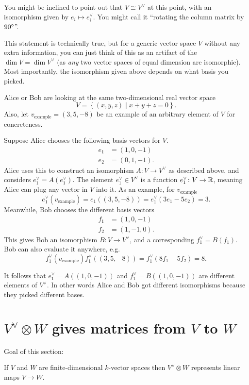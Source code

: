 You might be inclined to point out that $V \cong V^\vee$ at this point,
with an isomorphism given by $e_i \mapsto e_i^\vee$.
You might call it ``rotating the column matrix by $90^\circ$''.

This statement is technically true,
but for a generic vector space $V$ without any extra information,
you can just think of this as an artifact of the $\dim V = \dim V^\vee$
(as \emph{any} two vector spaces of equal dimension are isomorphic).
Most importantly, the isomorphism given above depends
on what basis you picked.

\begin{remark*}
	Alice or Bob are looking at the same two-dimensional real vector space
	\[ V = \left\{ (x,y,z) \mid x+y+z = 0 \right\}. \]
	Also, let $v_{\text{example}} = (3,5,-8)$
	be an example of an arbitrary element of $V$ for concreteness.

	Suppose Alice chooses the following basis vectors for $V$.
	\begin{align*}
		e_1 &= (1,0,-1) \\
		e_2 &= (0,1,-1).
	\end{align*}
	Alice uses this to construct an isomorphism $A \colon V \to V^\vee$
	as described above, and considers $e_1^\vee = A(e_1^\vee)$.
	The element $e_1^\vee \in V^\vee$ is a
	function $e_1^\vee \colon V \to \mathbb R$,
	meaning Alice can plug any vector in $V$ into it.
	As an example, for $v_{\text{example}}$
	\[ e_1^\vee(v_{\text{example}})
		= e_1\left( (3,5,-8) \right)
		= e_1^\vee\left( 3e_1 - 5e_2 \right) = 3. \]
	Meanwhile, Bob chooses the different basis vectors
	\begin{align*}
		f_1 &= (1,0,-1) \\
		f_2 &= (1,-1,0).
	\end{align*}
	This gives Bob an isomorphism $B \colon V \to V^\vee$,
	and a corresponding $f_1^\vee = B(f_1)$.
	Bob can also evaluate it anywhere, e.g.
	\[ f_1^\vee\left( v_{\text{example}} \right)
		f_1^\vee\left( (3, 5, -8) \right)
		= f_1^\vee\left( 8f_1 - 5f_2 \right) = 8. \]

	It follows that $e_1^\vee = A\left( (1,0,-1) \right)$
	and $f_1^\vee = B\left( (1,0,-1) \right)$
	are different elements of $V^\vee$.
	In other words Alice and Bob got different isomorphisms
	because they picked different bases.
\end{remark*}

\section{$V^\vee \otimes W$ gives matrices from $V$ to $W$}
Goal of this section:
\begin{moral}
	If $V$ and $W$ are finite-dimensional $k$-vector spaces
	then $V^\vee \otimes W$ represents linear maps $V \to W$.
\end{moral}

